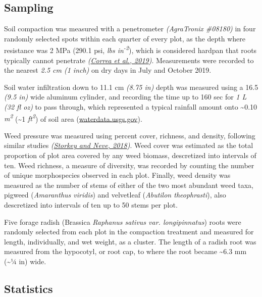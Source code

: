\documentclass[
  12pt,
]{article}
\begin{document}
\hypertarget{sampling}{%
\subsection{Sampling}\label{sampling}}

Soil compaction was measured with a penetrometer \emph{(AgraTronix \#08180)} in four randomly selected spots within each quarter of every plot, as the depth where resistance was 2 MPa (290.1 psi, \emph{lbs in\textsuperscript{-2}}), which is considered hardpan that roots typically cannot penetrate \emph{(\protect\hyperlink{ref-correa19}{Correa et al., 2019})}.
Measurements were recorded to the nearest \emph{2.5 cm (1 inch)} on dry days in July and October 2019.

Soil water infiltration down to 11.1 cm \emph{(8.75 in)} depth was measured using a 16.5 \emph{(9.5 in)} wide aluminum cylinder, and recording the time up to 160 sec for \emph{1 L (32 fl oz)} to pass through, which represented a typical rainfall amount onto \textasciitilde0.10 \emph{m\textsuperscript{2}} (\textasciitilde1 \emph{ft\textsuperscript{2}}) of soil area (\url{waterdata.usgs.gov}).

Weed pressure was measured using percent cover, richness, and density, following similar studies \emph{(\protect\hyperlink{ref-storkey18}{Storkey and Neve, 2018})}.
Weed cover was estimated as the total proportion of plot area covered by any weed biomass, descretized into intervals of ten.
Weed richness, a measure of diversity, was recorded by counting the number of unique morphospecies observed in each plot.
Finally, weed density was measured as the number of stems of either of the two most abundant weed taxa, pigweed (\emph{Amaranthus viridis}) and velvetleaf (\emph{Abutilon theophrasti}), also descretized into intervals of ten up to 50 stems per plot.

Five forage radish (Brassica \emph{Raphanus sativus var. longipinnatus}) roots were randomly selected from each plot in the compaction treatment and measured for length, individually, and wet weight, as a cluster.
The length of a radish root was measured from the hypocotyl, or root cap, to where the root became \textasciitilde6.3 mm (\textasciitilde1⁄4 in) wide.

\hypertarget{statistics}{%
\subsection{Statistics}\label{statistics}}
\end{document}

